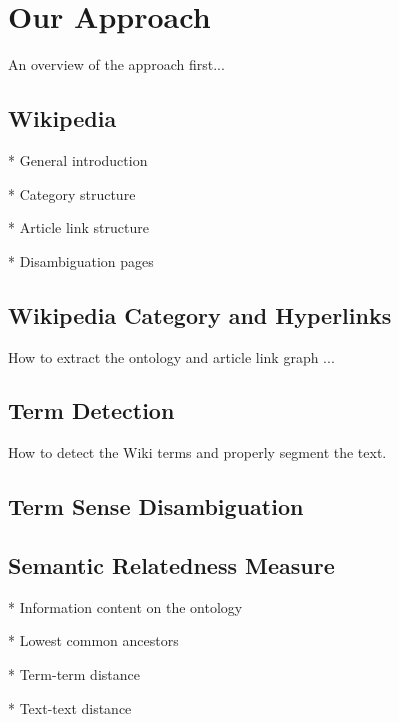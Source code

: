 \section{Our Approach}
\label{sec:approach}

An overview of the approach first...

\subsection{Wikipedia}
* General introduction \cite{wikipedia}

* Category structure

* Article link structure

* Disambiguation pages

\subsection{Wikipedia Category and Hyperlinks}
\label{sec:ontology}
How to extract the ontology and article link graph ...

\subsection{Term Detection}
\label{sec:detect}

How to detect the Wiki terms and properly segment the text.

\subsection{Term Sense Disambiguation}
\label{sec:tsd}

\subsection{Semantic Relatedness Measure}
\label{sec:distance}

* Information content on the ontology

* Lowest common ancestors

* Term-term distance

* Text-text distance


